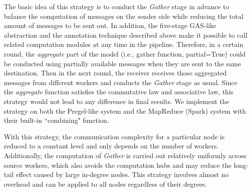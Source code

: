 \documentclass[conference]{IEEEtran}
\begin{document}
The basic idea of this strategy is to conduct the \emph{Gather} stage in advance to balance the computation of messages on the sender side while reducing the total amount of messages to be sent out. 
In addition, the five-stage GAS-like abstraction and the annotation technique described above make it possible to call 
related computation modules at any time in the pipeline.
Therefore, in a certain round, the \emph{aggregate} part of the model (i.e., gather function, partial=True) could be conducted using partially available messages when they are sent to the same destination.
Then in the next round, the receiver receives those aggregated messages from different workers and conducts the \emph{Gather} stage as usual.
Since the \emph{aggregate} function satisfies the commutative law and associative law, this strategy would not lead to any difference in final results.
We implement the strategy on both the Pregel-like system and the MapReduce (Spark) system with their built-in ``combining" function.

With this strategy, the communication complexity for a particular node is reduced to a constant level and only depends on the number of workers.
Additionally, the computation of \emph{Gather} is carried out relatively uniformly across source workers, which also avoids the computation hubs and may reduce the long-tail effect caused by large in-degree nodes.
This strategy involves almost no overhead and can be applied to all nodes regardless of their degrees.


\end{document}
